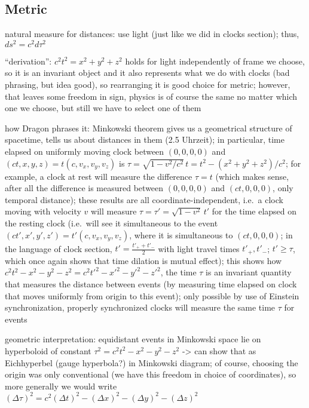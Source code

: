 		\subsection{Metric}
natural measure for distances: use light (just like we did in clocks section); thus, $ds^2 = c^2 d\tau^2$

\enquote{derivation}: $c^2 t^2 = x^2 + y^2 + z^2$ holds for light independently of frame we choose, so it is an invariant object and it also represents what we do with clocks (bad phrasing, but idea good), so rearranging it is good choice for metric; however, that leaves some freedom in sign, physics is of course the same no matter which one we choose, but still we have to select one of them


how Dragon phrases it: Minkowski theorem gives us a geometrical structure of spacetime, tells us about distances in them (2.5 Uhrzeit); in particular, time elapsed on uniformly moving clock between $(0, 0, 0, 0)$ and $(ct, x, y, z) = t (c, v_x, v_y, v_z)$ is $\tau = \sqrt{1 - v^2 / c^2} \, t = t^2 - (x^2 + y^2 + z^2) / c^2$; for example, a clock at rest will measure the difference $\tau = t$ (which makes sense, after all the difference is measured between $(0, 0, 0, 0)$ and $(ct, 0, 0, 0)$, only temporal distance); these results are all coordinate-independent, i.e.~a clock moving with velocity $v$ will measure $\tau = \tau' = \sqrt{1 - v^2} \, t'$ for the time elapsed on the resting clock (i.e.~will see it simultaneous to the event $(ct', x', y', z') = t' (c, v_x, v_y, v_z)$, where it is simultaneous to $(ct, 0, 0, 0)$; in the language of clock section, $t' = \frac{t'_+ + t'_-}{2}$ with light travel times $t'_+, t'_-$; $t' \geq \tau$, which once again shows that time dilation is mutual effect); this shows how $c^2 t^2 - x^2 - y^2 - z^2 = c^2 t'^2 - x'^2 - y'^2 - z'^2$, the time $\tau$ is an invariant quantity that measures the distance between events (by measuring time elapsed on clock that moves uniformly from origin to this event); only possible by use of Einstein synchronization, properly synchronized clocks will measure the same time $\tau$ for events



geometric interpretation: equidistant events in Minkowski space lie on hyperboloid of constant $\tau^2 = c^2 t^2 - x^2 - y^2 - z^2$ -> can show that as Eichhyperbel (gauge hyperbola?) in Minkowski diagram; of course, choosing the origin was only conventional (we have this freedom in choice of coordinates), so more generally we would write $(\Delta \tau)^2 = c^2 (\Delta t)^2 - (\Delta x)^2 - (\Delta y)^2 - (\Delta z)^2$

